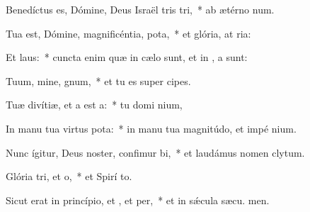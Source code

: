 \item Benedíctus es, Dómine, Deus Israël tris tri,~* ab ætérno  num.
\item Tua est, Dómine, magnificéntia,  pota,~* et glória, at ria:
\item Et  laus:~* cuncta enim quæ in cælo sunt, et in , a sunt:
\item Tuum, mine, gnum,~* et tu es super  cipes.
\item Tuæ divítiæ, et a est a:~* tu domi nium,
\item In manu tua virtus  pota:~* in manu tua magnitúdo, et impé nium.
\item Nunc ígitur, Deus noster, confimur bi,~* et laudámus nomen  clytum.
\item Glória tri, et o,~* et Spirí to.
\item Sicut erat in princípio, et , et per,~* et in sǽcula sæcu. men.

